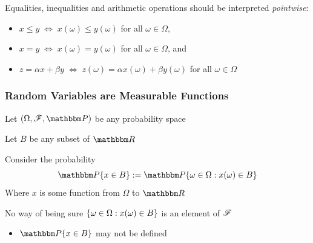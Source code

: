 \begin{frame}

    \vspace{2em}
    Equalities, inequalities and arithmetic operations should be
    interpreted \emph{pointwise}:
    \begin{itemize}
        \item $x \leq y \; \iff \; x(\omega) \leq y(\omega)$ for all $\omega \in
        \Omega$,
        \item $x = y \; \iff \; x(\omega) = y(\omega)$ for all $\omega \in
        \Omega$, and
        \item $z = \alpha x + \beta y \; \iff \; z(\omega) = \alpha x(\omega) +
            \beta y(\omega)$ for all $\omega \in \Omega$
    \end{itemize}

\end{frame}

\begin{frame}\frametitle{Random Variables are Measurable Functions}

    \vspace{2em}
    Let $(\Omega, \fF, \PP)$ be any probability space
    
    Let $B$ be
    any subset of $\RR$
    
    Consider the probability
    \begin{equation*}
        \PP\{x \in B\}
        := \PP\setntn{\omega \in \Omega}{x(\omega) \in B}
    \end{equation*}
    Where $x$ is some function from $\Omega$ to $\RR$
    
    No way of being sure $\{ \omega \in \Omega : x(\omega) \in B \}$ is an element of
    $\mathscr F$
    \begin{itemize}
        \item $\PP\{x \in B\}$ may not be defined
    \end{itemize}
    
\end{frame}

